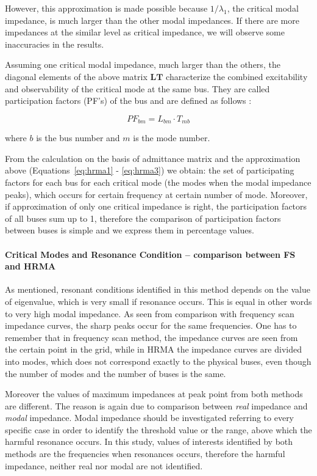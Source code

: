 \documentclass[12pt]{report} %
\begin{document}
However, this approximation is made possible because $1/\lambda_1$, the critical modal impedance, is much larger than the other modal impedances. If there are more impedances at the similar level as critical impedance, we will observe some inaccuracies in the results.

Assuming one critical modal impedance, much larger than the others, the diagonal elements of the above matrix $\bm{LT}$ characterize the combined excitability and observability of the critical mode at the same bus. They are called participation factors (PF's) of the bus and are defined as follows \cite{xu2005}:

\begin{equation} \label{eq:hrma3}
	PF_{bm}=L_{bm}\cdot T_{mb}
\end{equation}

where $b$ is the bus number and $m$ is the mode number.

From the calculation on the basis of admittance matrix and the  approximation above (Equations~\ref{eq:hrma1} - \ref{eq:hrma3}) we obtain: the set of participating factors for each bus for each critical mode (the modes when the modal impedance peaks), which occurs for certain frequency at certain number of mode. Moreover, if approximation of only one critical impedance is right, the participation factors of all buses sum up to 1, therefore the comparison of participation factors between buses is simple and we express them in percentage values.

\paragraph{Critical Modes and Resonance Condition – comparison between FS and HRMA}
As mentioned, resonant conditions identified in this method depends on the value of eigenvalue, which is very small if resonance occurs. This is equal in other words to very high modal impedance. As seen from comparison with frequency scan impedance curves, the sharp peaks occur for the same frequencies. One has to remember that in frequency scan method, the impedance curves are seen from the certain point in the grid, while in HRMA the impedance curves are divided into modes, which does not correspond exactly to the physical buses, even though the number of modes and the number of buses is the same.

Moreover the values of maximum impedances at peak point from both methods are different. The reason is again due to comparison between \textit{real} impedance and \textit{modal} impedance. Modal impedance should be investigated referring to every specific case in order to identify the threshold value or the range, above which the harmful resonance occurs. In this study, values of interests identified by both methods are the frequencies when resonances occurs, therefore the harmful impedance, neither real nor modal are not identified.
\end{document}
